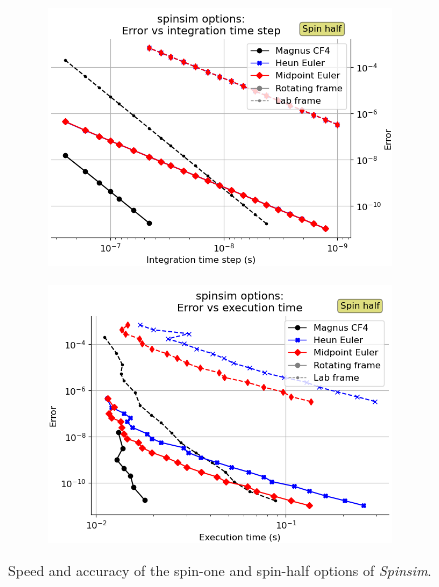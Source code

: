 \documentclass{jors}
\begin{document}
\begin{figure}[h!]
			\vfill
			\begin{subfigure}[b]{0.475\textwidth}
				\includegraphics[scale=0.475]{benchmark_spin_half_step_error.png}
				\caption{}
				\label{fig:benchmark_spin_half_step_error}
			\end{subfigure}
			\hfill
			\begin{subfigure}[b]{0.475\textwidth}
				\includegraphics[scale=0.475]{benchmark_spin_half_execution_error.png}
				\caption{}
				\label{fig:benchmark_spin_half_execution_error}
			\end{subfigure}
			\caption{Speed and accuracy of the spin-one and spin-half options of \emph{Spinsim}.
}
\end{figure}
\end{document}
